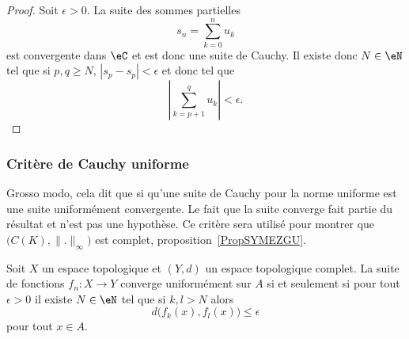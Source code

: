 \begin{proof}
	Soit \( \epsilon>0\). La suite des sommes partielles
	\begin{equation}
		s_n=\sum_{k=0}^nu_k
	\end{equation}
	est convergente dans \( \eC\) et est donc une suite de Cauchy. Il existe donc \( N\in \eN\) tel que si \( p,q\geq N\), \( | s_p-s_p |<\epsilon\) et donc tel que
	\begin{equation}
		| \sum_{k=p+1}^qu_k |<\epsilon.
	\end{equation}
\end{proof}

\subsubsection{Critère de Cauchy uniforme}

Grosso modo, cela dit que si qu'une suite de Cauchy pour la norme uniforme est une suite uniformément convergente. Le fait que la suite converge fait partie du résultat et n'est pas une hypothèse. Ce critère sera utilisé pour montrer que \( \big( C(K),\| . \|_{\infty} \big)\) est complet, proposition~\ref{PropSYMEZGU}.

\begin{proposition}   \label{PropNTEynwq}
	Soit \( X\) un espace topologique et \( (Y,d)\) un espace topologique complet. La suite de fonctions \( f_n\colon X\to Y\) converge uniformément sur \( A\) si et seulement si pour tout \( \epsilon>0\) il existe \( N\in \eN\) tel que si \( k,l>N\) alors
	\begin{equation}
		d\big( f_k(x),f_l(x) \big)\leq \epsilon
	\end{equation}
	pour tout \( x\in A\).
\end{proposition}

